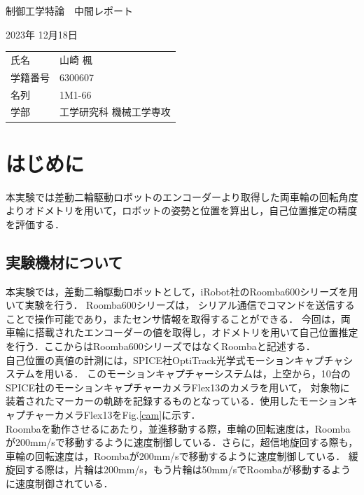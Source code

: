 \documentclass[a4paper,11pt]{jsarticle}
\begin{document}
\begin{titlepage}
%
\vspace*{-100pt}\noindent
{\Large 制御工学特論　中間レポート}\vspace{5pt} \par
2023年 12月18日   \vspace{5pt} \par
%
\begin{tabular}{@{}ll}
氏名  & 山崎 楓        \\
学籍番号 & 6300607\\
名列 & 1M1-66\\
学部  & 工学研究科 機械工学専攻
\end{tabular}
%
\end{titlepage}

\tableofcontents

\newpage

\section{はじめに}
本実験では差動二輪駆動ロボットのエンコーダーより取得した両車輪の回転角度よりオドメトリを用いて，ロボットの姿勢と位置を算出し，自己位置推定の精度を評価する．


\subsection{実験機材について}
本実験では，差動二輪駆動ロボットとして，iRobot社のRoomba600シリーズを用いて実験を行う．
Roomba600シリーズは，
シリアル通信でコマンドを送信することで操作可能であり，またセンサ情報を取得することができる．
今回は，両車輪に搭載されたエンコーダーの値を取得し，オドメトリを用いて自己位置推定を行う．ここからはRoomba600シリーズではなくRoombaと記述する．\\
自己位置の真値の計測には，SPICE社OptiTrack光学式モーションキャプチャシステムを用いる．
このモーションキャプチャーシステムは，上空から，10台のSPICE社のモーションキャプチャーカメラFlex13のカメラを用いて，
対象物に装着されたマーカーの軌跡を記録するものとなっている．使用したモーションキャプチャーカメラFlex13をFig.\ref{cam}に示す．\\
Roombaを動作させるにあたり，並進移動する際，車輪の回転速度は，Roombaが200mm/sで移動するように速度制御している．さらに，超信地旋回する際も，車輪の回転速度は，Roombaが200mm/sで移動するように速度制御している．
緩旋回する際は，片輪は200mm/s，もう片輪は50mm/sでRoombaが移動するように速度制御されている．\\
\end{document}
